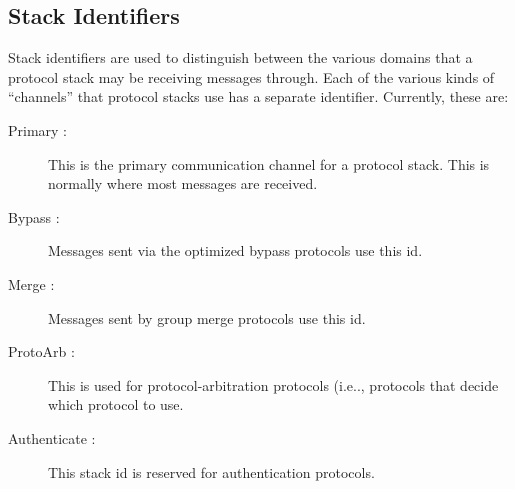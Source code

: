 \subsection{Stack Identifiers}
Stack identifiers are used to distinguish between the various domains that
a protocol stack may be receiving messages through.  Each of the various
kinds of ``channels'' that protocol stacks use has a separate identifier.
Currently, these are:
\begin{description}
\item
[Primary :] This is the primary communication channel for a protocol stack.
This is normally where most messages are received.
\item
[Bypass :] Messages sent via the optimized bypass protocols use this id. 
\item
[Merge :] Messages sent by group merge protocols use this id.
\item
[ProtoArb :] This is used for protocol-arbitration protocols (i.e.., protocols
that decide which protocol to use.
\item
[Authenticate :] This stack id is reserved for authentication protocols.
\end{description}
